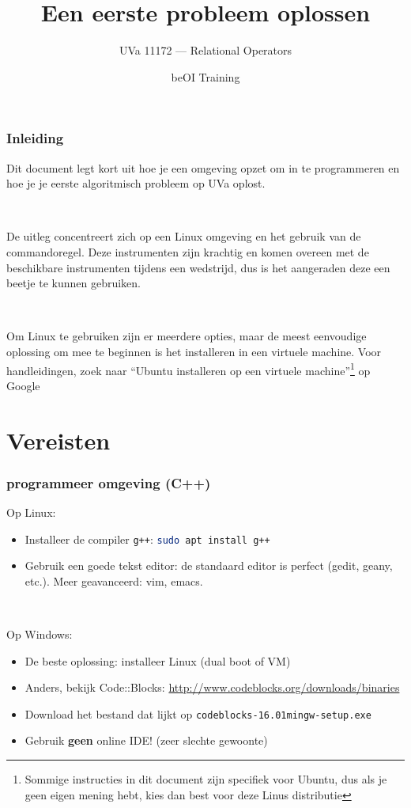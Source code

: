 \documentclass[12pt]{beamer}
\title{Een eerste probleem oplossen}
\subtitle{UVa 11172 --- Relational Operators}
\author{beOI Training}
\institute{\texttt{[image: ../share/beoi-logo]}}
\date{}
\newcommand{\urlb}[1]{{\color{linkblue}\url{#1}}}
\begin{document}
\maketitle

\begin{frame}
\frametitle{Inleiding}
Dit document legt kort uit hoe je een omgeving opzet om in te programmeren en hoe je je eerste algoritmisch probleem op UVa oplost.

~

De uitleg concentreert zich op een Linux omgeving en het gebruik van de commandoregel. Deze instrumenten zijn krachtig en komen overeen met de beschikbare instrumenten tijdens een wedstrijd, dus is het aangeraden deze een beetje te kunnen gebruiken.

~

Om Linux te gebruiken zijn er meerdere opties, maar de meest eenvoudige oplossing om mee te beginnen is het installeren in een virtuele machine. Voor handleidingen, zoek naar ``Ubuntu installeren op een virtuele machine''\footnote{Sommige instructies in dit document zijn specifiek voor Ubuntu, dus als je geen eigen mening hebt, kies dan best voor deze Linus distributie} op Google
\end{frame}


\section{Vereisten}

\edef\hc{\string:}
\begin{frame}
\frametitle{programmeer omgeving (C++)}
Op Linux:
\begin{itemize}
    \item Installeer de compiler \texttt{g++}: \lstinline[language=bash]|sudo apt install g++|
    \item Gebruik een goede tekst editor: de standaard editor is perfect (gedit, geany, etc.). Meer geavanceerd: vim, emacs.
\end{itemize}

~

Op Windows:
\begin{itemize}
    \item De beste oplossing: installeer Linux (dual boot of VM)
    \item Anders, bekijk Code\hc\hc{}Blocks: \urlb{http://www.codeblocks.org/downloads/binaries}
    \item Download het bestand dat lijkt op \texttt{codeblocks-16.01mingw-setup.exe}
    \item Gebruik \textbf{geen} online IDE! (zeer slechte gewoonte)
\end{itemize}
\end{frame}
\end{document}
